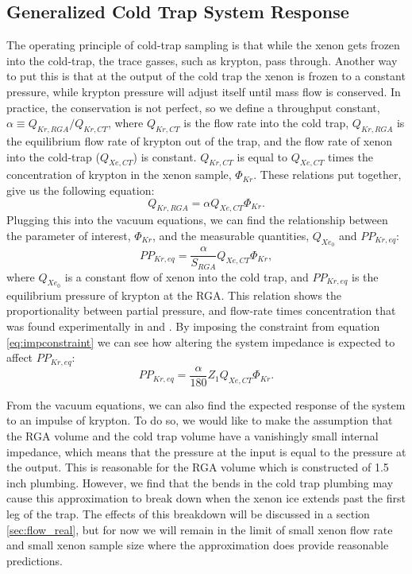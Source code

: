 \subsection{Generalized Cold Trap System Response}
\label{sec:response}
The operating principle of cold-trap sampling is that while the xenon gets frozen into the cold-trap, the trace gasses, such as krypton, pass through. Another way to put this is that at the output of the cold trap the xenon is frozen to a constant pressure, while krypton pressure will adjust itself until mass flow is conserved. In practice, the conservation is not perfect, so we define a throughput constant, $\alpha \equiv Q_{Kr,RGA}/Q_{Kr,CT}$, where $Q_{Kr,CT}$ is the flow rate into the cold trap, $Q_{Kr,RGA}$ is the equilibrium flow rate of krypton out of the trap, and the flow rate of xenon into the cold-trap ($Q_{Xe,CT}$) is constant. $Q_{Kr,CT}$ is equal to $Q_{Xe,CT}$ times the concentration of krypton in the xenon sample, $\Phi_{Kr}$. These relations put together, give us the following equation: 
\begin{equation}
Q_{Kr,RGA}=\alpha Q_{Xe,CT}\Phi_{Kr}.
\end{equation}
Plugging this into the vacuum equations, we can find the relationship between the parameter of interest, $\Phi_{Kr}$, and the measurable quantities, $Q_{Xe_0}$ and $PP_{Kr,eq}$:
\begin{equation}
\label{eq:krpres1}
PP_{Kr,eq}=\frac{\alpha}{S_{RGA}}Q_{Xe,CT}\Phi_{Kr},
\end{equation}
where $Q_{Xe_0}$ is a constant flow of xenon into the cold trap, and $PP_{Kr,eq}$ is the equilibrium pressure of krypton at the RGA. This relation shows the proportionality between partial pressure, and flow-rate times concentration that was found experimentally in \cite{sampling_doug} and \cite{sampling_dm}. By imposing the constraint from equation \ref{eq:impconstraint} we can see how altering the system impedance is expected to affect $PP_{Kr,eq}$:
\begin{equation}
\label{eq:krpres2}
PP_{Kr,eq}=\frac{\alpha}{180}Z_{1}Q_{Xe,CT}\Phi_{Kr}.
\end{equation}

From the vacuum equations, we can also find the expected response of the system to an impulse of krypton. To do so, we would like to make the assumption that the RGA volume and the cold trap volume have a vanishingly small internal impedance, which means that the pressure at the input is equal to the pressure at the output. This is reasonable for the RGA volume which is constructed of 1.5 inch plumbing. However, we find that the bends in the cold trap plumbing may cause this approximation to break down when the xenon ice extends past the first leg of the trap. The effects of this breakdown will be discussed in a section \ref{sec:flow_real}, but for now we will remain in the limit of small xenon flow rate and small xenon sample size where the approximation does provide reasonable predictions.

